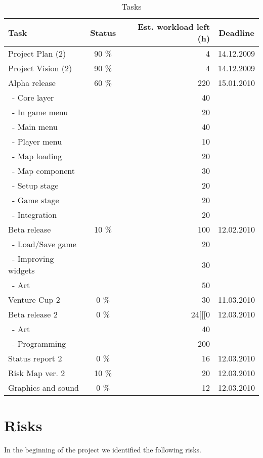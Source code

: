 \documentclass[12pt,a4paper]{article}
\begin{document}
\begin{table}[h!]
\small
\begin{tabular}{ l | c | r | c}
Task				&Status		&Est. workload left (h)	&Deadline \\\hline\hline
Project Plan (2) 	&90	\%		&4					&14.12.2009\\
Project Vision (2)	&90 	\%		&4					&14.12.2009\\
Alpha release		&60 	\%		&220				&15.01.2010\\
\ - Core layer		&			&40					&\\
\ - In game menu	&			&20					&\\
\ - Main menu		&			&40					&\\
\ - Player menu		&			&10					&\\
\ - Map loading		&			&20					&\\
\ - Map component	&			&30					&\\
\ - Setup stage		&			&20					&\\
\ - Game stage		&			&20					&\\
\ - Integration		&			&20					&\\
Beta release		&10 \%		&100				&12.02.2010\\
\ - Load/Save game	&			&20					&\\
\ - Improving widgets	&			&30					&\\
\ - Art				&			&50					&\\
Venture Cup 2		&0 \%		&30					&11.03.2010\\
Beta release 2		&0 \%		&24[[[0				&12.03.2010\\
\ - Art				&			&40					&\\
\ - Programming	&			&200				&\\
Status report 2		&0 \%		&16					&12.03.2010\\
Risk Map ver. 2		&10 \%		&20					&12.03.2010\\
Graphics and sound	&0 \%		&12					&12.03.2010
\end{tabular}
\caption{Tasks}
\label{tab:tasks}
\end{table}

\section{Risks}

In the beginning of the project we identified the following risks.
\end{document}
